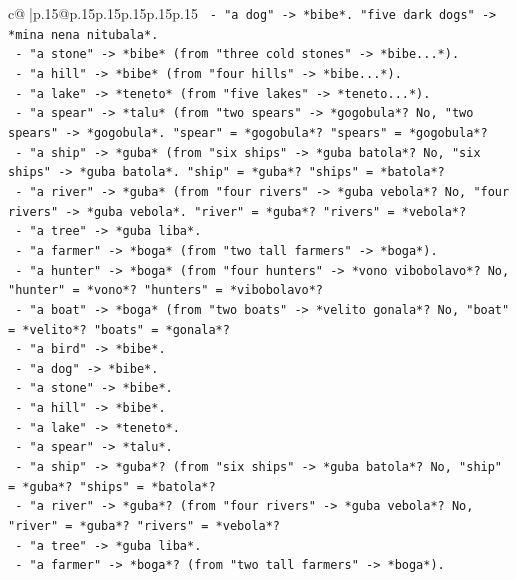 \documentclass{article}
\begin{document}
{\begin{supertabular}{c@{$\;$}|p{.15\linewidth}@{}p{.15\linewidth}p{.15\linewidth}p{.15\linewidth}p{.15\linewidth}p{.15\linewidth}}
{{{\texttt{      {-} "a dog" {-}> *bibe*. "five dark dogs" {-}> *mina nena nitubala*.} \\
\texttt{      {-} "a stone" {-}> *bibe* (from "three cold stones" {-}> *bibe...*).} \\
\texttt{      {-} "a hill" {-}> *bibe* (from "four hills" {-}> *bibe...*).} \\
\texttt{      {-} "a lake" {-}> *teneto* (from "five lakes" {-}> *teneto...*).} \\
\texttt{      {-} "a spear" {-}> *talu* (from "two spears" {-}> *gogobula*? No, "two spears" {-}> *gogobula*. "spear" = *gogobula*? "spears" = *gogobula*?} \\
\texttt{      {-} "a ship" {-}> *guba* (from "six ships" {-}> *guba batola*? No, "six ships" {-}> *guba batola*. "ship" = *guba*? "ships" = *batola*?} \\
\texttt{      {-} "a river" {-}> *guba* (from "four rivers" {-}> *guba vebola*? No, "four rivers" {-}> *guba vebola*. "river" = *guba*? "rivers" = *vebola*?} \\
\texttt{      {-} "a tree" {-}> *guba liba*.} \\
\texttt{      {-} "a farmer" {-}> *boga* (from "two tall farmers" {-}> *boga*).} \\
\texttt{      {-} "a hunter" {-}> *boga* (from "four hunters" {-}> *vono vibobolavo*? No, "hunter" = *vono*? "hunters" = *vibobolavo*?} \\
\texttt{      {-} "a boat" {-}> *boga* (from "two boats" {-}> *velito gonala*? No, "boat" = *velito*? "boats" = *gonala*?} \\
\texttt{      {-} "a bird" {-}> *bibe*.} \\
\texttt{      {-} "a dog" {-}> *bibe*.} \\
\texttt{      {-} "a stone" {-}> *bibe*.} \\
\texttt{      {-} "a hill" {-}> *bibe*.} \\
\texttt{      {-} "a lake" {-}> *teneto*.} \\
\texttt{      {-} "a spear" {-}> *talu*.} \\
\texttt{      {-} "a ship" {-}> *guba*? (from "six ships" {-}> *guba batola*? No, "ship" = *guba*? "ships" = *batola*?} \\
\texttt{      {-} "a river" {-}> *guba*? (from "four rivers" {-}> *guba vebola*? No, "river" = *guba*? "rivers" = *vebola*?} \\
\texttt{      {-} "a tree" {-}> *guba liba*.} \\
\texttt{      {-} "a farmer" {-}> *boga*? (from "two tall farmers" {-}> *boga*).} \\
}}}
\end{supertabular}}
\end{document}
